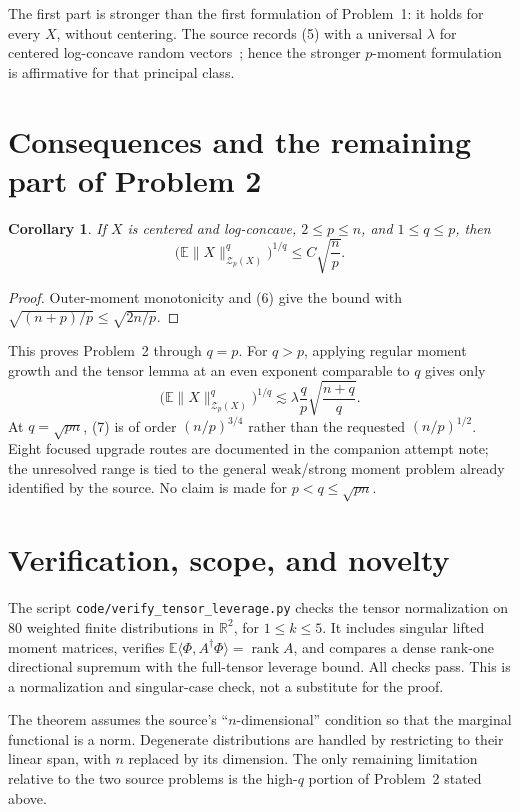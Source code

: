 \documentclass[10pt]{article}
\newtheorem{corollary}{Corollary}
\newcommand{\R}{\mathbb R}
\newcommand{\E}{\mathbb E}
\newcommand{\Zp}{\mathcal Z}
\begin{document}
The first part is stronger than the first formulation of Problem~1: it holds
for every $X$, without centering.  The source records (5) with a universal
$\lambda$ for centered log-concave random vectors~\cite{source}; hence the
stronger $p$-moment formulation is affirmative for that principal class.

\section{Consequences and the remaining part of Problem 2}
\begin{corollary}
If $X$ is centered and log-concave, $2\le p\le n$, and $1\le q\le p$, then
\[
 \big(\E\|X\|_{\Zp_p(X)}^q\big)^{1/q}\le C\sqrt{\frac np}.
\]
\end{corollary}
\begin{proof}
Outer-moment monotonicity and (6) give the bound with
$\sqrt{(n+p)/p}\le\sqrt{2n/p}$.
\end{proof}

This proves Problem~2 through $q=p$.  For $q>p$, applying regular moment
growth and the tensor lemma at an even exponent comparable to $q$ gives only
\[
 \big(\E\|X\|_{\Zp_p(X)}^q\big)^{1/q}
 \lesssim \lambda\frac qp\sqrt{\frac{n+q}{q}}.              \tag{7}
\]
At $q=\sqrt{pn}$, (7) is of order $(n/p)^{3/4}$ rather than the requested
$(n/p)^{1/2}$.  Eight focused upgrade routes are documented in the companion
attempt note; the unresolved range is tied to the general weak/strong moment
problem already identified by the source.  No claim is made for
$p<q\le\sqrt{pn}$.

\section{Verification, scope, and novelty}
The script \texttt{code/verify\_tensor\_leverage.py} checks the tensor
normalization on 80 weighted finite distributions in $\R^2$, for
$1\le k\le5$.  It includes singular lifted moment matrices, verifies
$\E\langle\Phi,A^\dagger\Phi\rangle=\operatorname{rank}A$, and compares a
dense rank-one directional supremum with the full-tensor leverage bound.  All
checks pass.  This is a normalization and singular-case check, not a substitute
for the proof.

The theorem assumes the source's ``$n$-dimensional'' condition so that the
marginal functional is a norm.  Degenerate distributions are handled by
restricting to their linear span, with $n$ replaced by its dimension.  The
only remaining limitation relative to the two source problems is the
high-$q$ portion of Problem~2 stated above.
\end{document}
